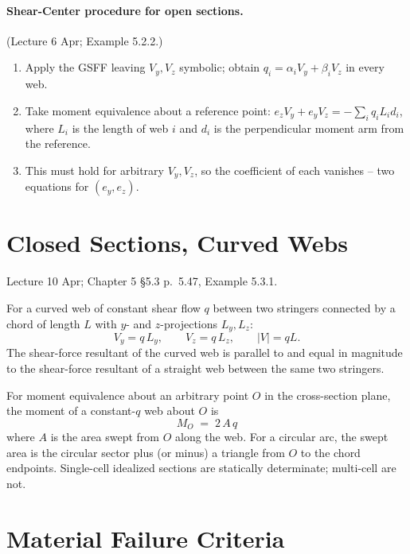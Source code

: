 \documentclass[11pt]{article}
\begin{document}
\paragraph{Shear-Center procedure for open sections.} (Lecture 6 Apr; Example 5.2.2.)
\begin{enumerate}[leftmargin=2em, itemsep=1pt]
  \item Apply the GSFF leaving $V_y, V_z$ symbolic; obtain $q_i = \alpha_i V_y + \beta_i V_z$ in every web.
  \item Take moment equivalence about a reference point: $e_z V_y + e_y V_z = -\sum_i q_i L_i d_i$, where $L_i$ is the length of web $i$ and $d_i$ is the perpendicular moment arm from the reference.
  \item This must hold for arbitrary $V_y, V_z$, so the coefficient of each vanishes -- two equations for $(e_y, e_z)$.
\end{enumerate}

\section{Closed Sections, Curved Webs}

\begin{citebox}{Lecture 10 Apr; Chapter 5 \S5.3 p.~5.47, Example 5.3.1.}
\end{citebox}

For a curved web of constant shear flow $q$ between two stringers connected by a chord of length $L$ with $y$- and $z$-projections $L_y, L_z$:
\begin{equation}
V_y = q\,L_y, \qquad V_z = q\,L_z, \qquad |V| = q L.
\end{equation}
The shear-force resultant of the curved web is parallel to and equal in magnitude to the shear-force resultant of a straight web between the same two stringers.

For moment equivalence about an arbitrary point $O$ in the cross-section plane, the moment of a constant-$q$ web about $O$ is
\begin{equation}
\boxed{\;M_O \;=\; 2\,A\,q\;}\label{eq:Mq}
\end{equation}
where $A$ is the area swept from $O$ along the web. For a circular arc, the swept area is the circular sector plus (or minus) a triangle from $O$ to the chord endpoints. Single-cell idealized sections are statically determinate; multi-cell are not.

\section{Material Failure Criteria}
\end{document}
